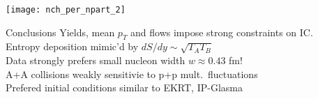 \documentclass[xcolor=dvipsnames]{beamer}
\begin{document}
\begin{frame}
    \texttt{[image: nch\_per\_npart\_2]}
\end{frame}

\begin{frame}{Conclusions}
Yields, mean $p_T$ and flows impose strong constraints on IC. \\
Entropy  deposition mimic'd by $dS/dy \sim \sqrt{T_A T_B}$ \\
Data strongly prefers small nucleon width $w \approx 0.43$ fm! \\
A+A collisions weakly sensitivie to p+p mult.\ fluctuations \\
Prefered initial conditions similar to EKRT, IP-Glasma \\


\end{frame}
\end{document}
